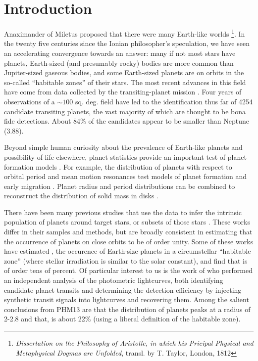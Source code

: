 \section{Introduction}
\label{sec:introduction}

Anaximander of Miletus proposed that there were many Earth-like worlds
\footnote{{\it Dissertation on the Philosophy of Aristotle, in which
    his Pricipal Physical and Metaphysical Dogmas are Unfolded},
  transl. by T. Taylor, London, 1812}.  In the twenty five centuries
since the Ionian philosopher's speculation, we have seen an
accelerating convergence towards an answer: many if not most stars
have planets, Earth-sized (and presumably rocky) bodies are more 
common than Jupiter-sized gaseous bodies, and
some Earth-sized planets are on orbits in the so-called
``habitable zones'' of their stars. The most recent advances in this
field have come from data collected by the \kep{} transiting-planet
mission \citep{Borucki2010}.  Four years of observations of a $\sim
100$ sq. deg. field have led to the identification thus far
of 4254 candidate transiting planets, the vast majority of
which are thought to be bona fide detections. About 84\% of the
candidates appear to be smaller than Neptune (3.88\rearth{}).

Beyond simple human curiosity about the prevalence of Earth-like
planets and possibility of life elsewhere, planet statistics provide
an important test of planet formation models \citep[e.g.][]{Benz2014}.
For example, the distribution of planets with respect to orbital
period and mean motion resonances test models of planet formation and
early migration \citep[e.g.,][]{HansenMurray,Baruteau2013}.  Planet
radius and period distributions can be combined to reconstruct the
distribution of solid mass in disks
\citep[e.g.,][]{Chiang2013,Raymond2014}.

There have been many previous studies that use the \kep{} data to
infer the intrinsic population of planets around \kep{} target stars,
or subsets of those stars
\citep[e.g.][]{Catanzarite,Youdin,Traub2012,Howard2012,Fressin2013,
  Dressing2013,Gaidos2013,Dong2013,Kopparapu2013b,Petigura2013}.
These works differ in their samples and methods, but are broadly
consistent in estimating that the occurrence of planets on close
orbits to be of order unity.  Some of these works have estimated \ee{}, the
occurence of Earth-size planets in a circumstellar ``habitable zone''
(where stellar irradiation is similar to the solar constant), and find
that \ee{} is of order tens of percent.  Of particular interest to us
is the work of \citet[][hereafter PHM13]{Petigura2013} who performed
an independent analysis of the \kep{} photometric lightcurves, both
identifying candidate planet transits and determining the detection
efficiency by injecting synthetic transit signals into \kep{}
lightcurves and recovering them.  Among the salient conclusions from
PHM13 are that the distribution of planets peaks at a radius of
2-2.8\rearth{} and that, \ee{} is about 22\% (using a liberal
definition of the habitable zone).

